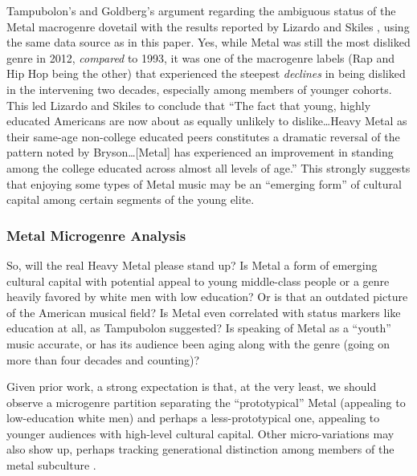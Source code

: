 \documentclass[a4paper,12pt]{extarticle}
\begin{document}
Tampubolon's and Goldberg's argument regarding the ambiguous status of the Metal macrogenre dovetail with the results reported by Lizardo and Skiles \citeyearpar{lizardo_skiles15}, using the same data source as in this paper. Yes, while Metal was still the most disliked genre in 2012, \textit{compared} to 1993, it was one of the macrogenre labels (Rap and Hip Hop being the other) that experienced the steepest \textit{declines} in being disliked in the intervening two decades, especially among members of younger cohorts. This led Lizardo and Skiles \citeyearpar[][18]{lizardo_skiles15} to conclude that ``The fact that young, highly educated Americans are now about as equally unlikely to dislike\ldots Heavy Metal as their same-age non-college educated peers constitutes a dramatic reversal of the pattern noted by Bryson\ldots [Metal] has experienced an improvement in standing among the college educated across almost all levels of age.'' This strongly suggests that enjoying some types of Metal music may be an ``emerging form'' of cultural capital \cite{prieur2013emerging} among certain segments of the young elite.  

\subsubsection{Metal Microgenre Analysis}
So, will the real Heavy Metal please stand up? Is Metal a form of emerging cultural capital with potential appeal to young middle-class people or a genre heavily favored by white men with low education? Or is that an outdated picture of the American musical field? Is Metal even correlated with status markers like education at all, as Tampubolon suggested? Is speaking of Metal as a ``youth'' music accurate, or has its audience been aging along with the genre (going on more than four decades and counting)? 

Given prior work, a strong expectation is that, at the very least, we should observe a microgenre partition separating the ``prototypical'' Metal (appealing to low-education white men) and perhaps a less-prototypical one, appealing to younger audiences with high-level cultural capital. Other micro-variations may also show up, perhaps tracking generational distinction among members of the metal subculture \citep{koch2020evolutionary}.
\end{document}
